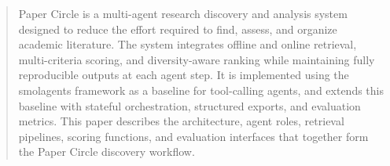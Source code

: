 \begin{abstract}
Paper Circle is a multi-agent research discovery and analysis system designed to reduce the effort required to find, assess, and organize academic literature. The system integrates offline and online retrieval, multi-criteria scoring, and diversity-aware ranking while maintaining fully reproducible outputs at each agent step. It is implemented using the smolagents framework as a baseline for tool-calling agents, and extends this baseline with stateful orchestration, structured exports, and evaluation metrics. This paper describes the architecture, agent roles, retrieval pipelines, scoring functions, and evaluation interfaces that together form the Paper Circle discovery workflow.
\end{abstract}
